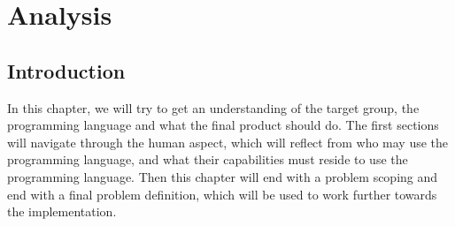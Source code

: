 \chapter{Analysis}\label{ch:ch2label}
\section{Introduction}
In this chapter, we will try to get an understanding of the target group, the programming language and what the final product should do. The first sections will navigate through the human aspect, which will reflect from who may use the programming language, and what their capabilities must reside to use the programming language. Then this chapter will end with a problem scoping and end with a final problem definition, which will be used to work further towards the implementation.